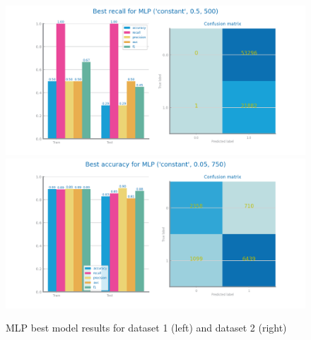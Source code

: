 \documentclass[10pt]{extarticle}
\begin{document}
\begin{figure}[H]
\centering\includegraphics[scale=0.4]{images/dataset1/models_evaluation/CovidPos_mlp_MLP_best_recall_eval.png}
\includegraphics[scale=0.4]{images/dataset2/models_evaluation/Credit_Score_mlp_MLP_best_accuracy_eval.png}
\caption{MLP best model results for dataset 1 (left) and dataset 2 (right)}
\end{figure}
\end{document}
